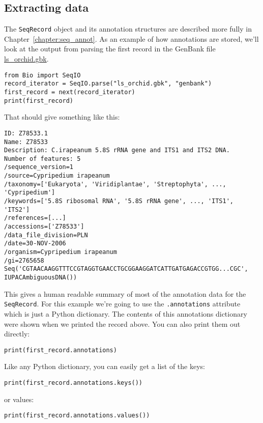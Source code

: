 \subsection{Extracting data}

The \verb|SeqRecord| object and its annotation structures are described more fully in
Chapter~\ref{chapter:seq_annot}.  As an example of how annotations are stored, we'll look at the output from parsing the first record in the GenBank file \href{https://raw.githubusercontent.com/biopython/biopython/master/Doc/examples/ls_orchid.gbk}{ls\_orchid.gbk}.

\begin{verbatim}
from Bio import SeqIO
record_iterator = SeqIO.parse("ls_orchid.gbk", "genbank")
first_record = next(record_iterator)
print(first_record)
\end{verbatim}

\noindent That should give something like this:

\begin{verbatim}
ID: Z78533.1
Name: Z78533
Description: C.irapeanum 5.8S rRNA gene and ITS1 and ITS2 DNA.
Number of features: 5
/sequence_version=1
/source=Cypripedium irapeanum
/taxonomy=['Eukaryota', 'Viridiplantae', 'Streptophyta', ..., 'Cypripedium']
/keywords=['5.8S ribosomal RNA', '5.8S rRNA gene', ..., 'ITS1', 'ITS2']
/references=[...]
/accessions=['Z78533']
/data_file_division=PLN
/date=30-NOV-2006
/organism=Cypripedium irapeanum
/gi=2765658
Seq('CGTAACAAGGTTTCCGTAGGTGAACCTGCGGAAGGATCATTGATGAGACCGTGG...CGC', IUPACAmbiguousDNA())
\end{verbatim}

This gives a human readable summary of most of the annotation data for the \verb|SeqRecord|.
For this example we're going to use the \verb|.annotations| attribute which is just a Python dictionary.
The contents of this annotations dictionary were shown when we printed the record above.
You can also print them out directly:
\begin{verbatim}
print(first_record.annotations)
\end{verbatim}
\noindent Like any Python dictionary, you can easily get a list of the keys:
\begin{verbatim}
print(first_record.annotations.keys())
\end{verbatim}
\noindent or values:
\begin{verbatim}
print(first_record.annotations.values())
\end{verbatim}

